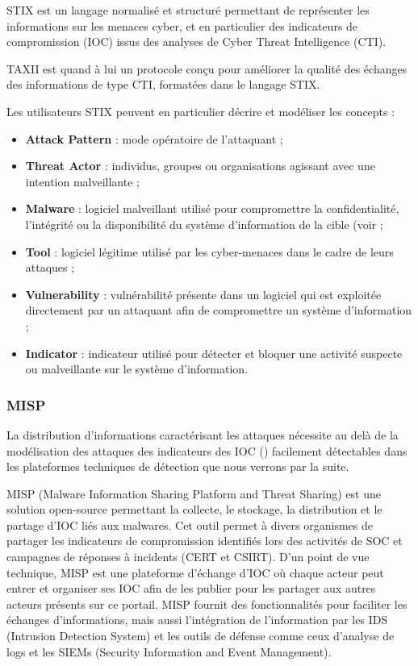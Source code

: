 STIX est un langage normalisé et structuré permettant de représenter les informations sur les menaces cyber, et en particulier des indicateurs de compromission (IOC) issus des analyses de Cyber Threat Intelligence (CTI).

TAXII est quand à lui un protocole conçu pour améliorer la qualité des échanges des informations de type CTI, formatées dans le langage STIX.

Les utilisateurs STIX peuvent en particulier décrire et modéliser les concepts  :

\begin{itemize}
  \item \textbf{Attack Pattern} : mode opératoire de l’attaquant ;
  \item \textbf{Threat Actor }: individus, groupes ou organisations agissant avec une intention malveillante ;
  \item \textbf{Malware} : logiciel malveillant utilisé pour compromettre la confidentialité, l'intégrité ou la disponibilité du système d’information de la cible (voir ;
  \item \textbf{Tool} : logiciel légitime utilisé par les cyber-menaces dans le cadre de leurs attaques ;
  \item \textbf{Vulnerability} : vulnérabilité présente dans un logiciel qui est exploitée directement par un attaquant afin de compromettre un système d’information ;
  \item  \textbf{Indicator} : indicateur utilisé pour détecter et bloquer une activité suspecte ou malveillante sur le système d’information.
\end{itemize}


\subsubsection{MISP}

La distribution d'informations caractérisant les attaques nécessite au delà de la modélisation des attaques des indicateurs des IOC () facilement détectables dans les plateformes techniques de détection que nous verrons par la suite.

MISP (Malware Information Sharing Platform and Threat Sharing) est une solution open-source permettant la collecte, le stockage, la distribution et le partage d’IOC liés aux malwares. Cet outil permet à divers organismes de partager les indicateurs de compromission identifiés lors des activités de SOC et campagnes de réponses à incidents (CERT et CSIRT).  D’un point de vue technique, MISP est une plateforme d’échange d’IOC où chaque acteur peut entrer et organiser ses IOC afin de les publier pour les partager aux autres acteurs présents sur ce portail.  MISP fournit des fonctionnalités pour faciliter les échanges d'informations, mais aussi l’intégration de l'information par les IDS (Intrusion Detection System) et les outils de défense comme ceux d'analyse de logs et les SIEMs (Security Information and Event Management).



